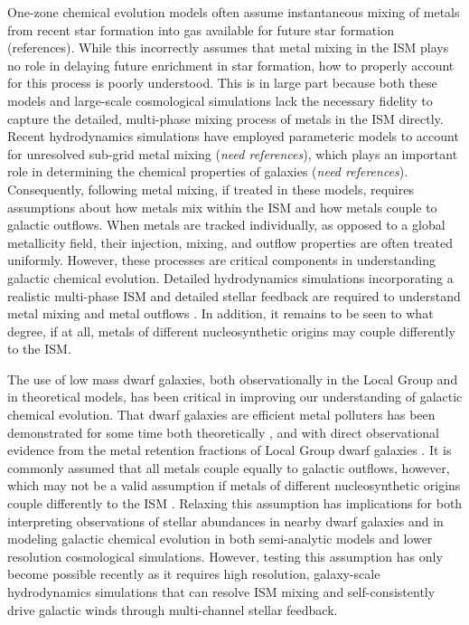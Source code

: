 \documentclass[twocolumn]{aastex61}
\begin{document}
One-zone chemical evolution models often assume instantaneous mixing of metals from recent star formation into gas available for future star formation (references). While this incorrectly assumes that metal mixing in the ISM plays no role in delaying future enrichment in star formation, how to properly account for this process is poorly understood. This is in large part because both these models and large-scale cosmological simulations lack the necessary fidelity to capture the detailed, multi-phase mixing process of metals in the ISM directly. Recent hydrodynamics simulations have employed parameteric models to account for unresolved sub-grid metal mixing (\textit{need references}), which plays an important role in determining the chemical properties of galaxies (\textit{need references}). Consequently, following metal mixing, if treated in these models, requires assumptions about how metals mix within the ISM and how metals couple to galactic outflows. When metals are tracked individually, as opposed to a global metallicity field, their injection, mixing, and outflow properties are often treated uniformly. However, these processes are critical components in understanding galactic chemical evolution. Detailed hydrodynamics simulations incorporating a realistic multi-phase ISM and detailed stellar feedback are required to understand metal mixing and metal outflows \citep[e.g.][]{Armillotta2018}. In addition, it remains to be seen to what degree, if at all, metals of different nucleosynthetic origins may couple differently to the ISM.

The use of low mass dwarf galaxies, both observationally in the Local Group and in theoretical models, has been critical in improving our understanding of galactic chemical evolution. That dwarf galaxies are efficient metal polluters has been demonstrated for some time both theoretically
\citep[e.g.][]{DekelSilk1986,MacLowFerrara1999,Fragile2004},
and with direct observational evidence from the metal retention fractions of Local Group dwarf galaxies \citep[e.g.][]{Kirby2011-metals,McQuinn2015}. It is commonly assumed that all metals couple equally to galactic outflows, however, which may not be a valid assumption if metals of different nucleosynthetic origins couple differently to the ISM \citep{KrumholzTing2018}. Relaxing this assumption has implications for both interpreting observations of stellar abundances in nearby dwarf galaxies and in modeling galactic chemical evolution in both semi-analytic models and lower resolution cosmological simulations. However, testing this assumption has only become possible recently as it requires high resolution, galaxy-scale hydrodynamics simulations that can resolve ISM mixing and self-consistently drive galactic winds through multi-channel stellar feedback.
\end{document}
